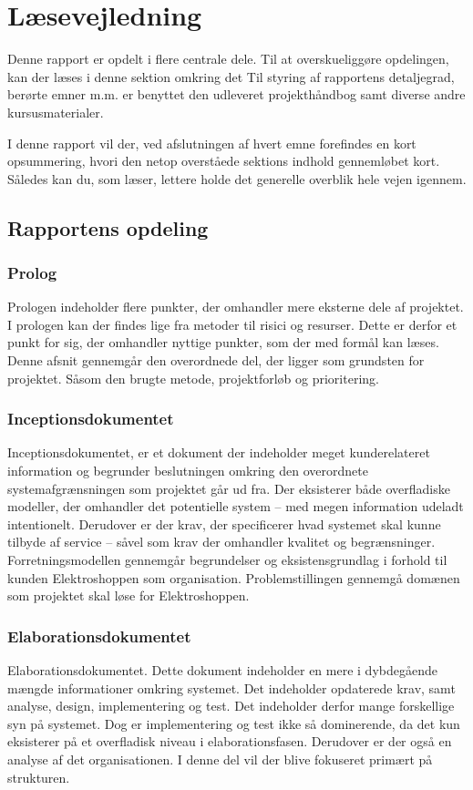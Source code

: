\newpage
\section{Læsevejledning}

Denne rapport er opdelt i flere centrale dele. Til at overskueliggøre opdelingen, kan der læses i denne sektion omkring det Til styring af rapportens detaljegrad, berørte emner m.m. er benyttet den udleveret projekthåndbog samt diverse andre kursusmaterialer.

I denne rapport vil der, ved afslutningen af hvert emne forefindes en kort opsummering, hvori den netop overståede sektions indhold gennemløbet kort. Således kan du, som læser, lettere holde det generelle overblik hele vejen igennem.


\subsection{Rapportens opdeling}
\subsubsection{Prolog}
Prologen indeholder flere punkter, der omhandler mere eksterne dele af projektet. I prologen kan der findes lige fra metoder til risici og resurser. Dette er derfor et punkt for sig, der omhandler nyttige punkter, som der med formål kan læses. Denne afsnit gennemgår den overordnede del, der ligger som grundsten for projektet. Såsom den brugte metode, projektforløb og prioritering.

\subsubsection{Inceptionsdokumentet}
Inceptionsdokumentet, er et dokument der indeholder meget kunderelateret information og begrunder beslutningen omkring den overordnete systemafgrænsningen som projektet går ud fra. Der eksisterer både overfladiske modeller, der omhandler det potentielle system – med megen information udeladt intentionelt. Derudover er der krav, der specificerer hvad systemet skal kunne tilbyde af service – såvel som krav der omhandler kvalitet og begrænsninger. Forretningsmodellen gennemgår begrundelser og eksistensgrundlag i forhold til kunden Elektroshoppen som organisation. Problemstillingen gennemgå domænen som projektet skal løse for Elektroshoppen.

\subsubsection{Elaborationsdokumentet}
Elaborationsdokumentet. Dette dokument indeholder en mere i dybdegående mængde informationer omkring systemet. Det indeholder opdaterede krav, samt analyse, design, implementering og test. Det indeholder derfor mange forskellige syn på systemet. Dog er implementering og test ikke så dominerende, da det kun eksisterer på et overfladisk niveau i elaborationsfasen. Derudover er der også en analyse af det organisationen. I denne del vil der blive fokuseret primært på strukturen.

